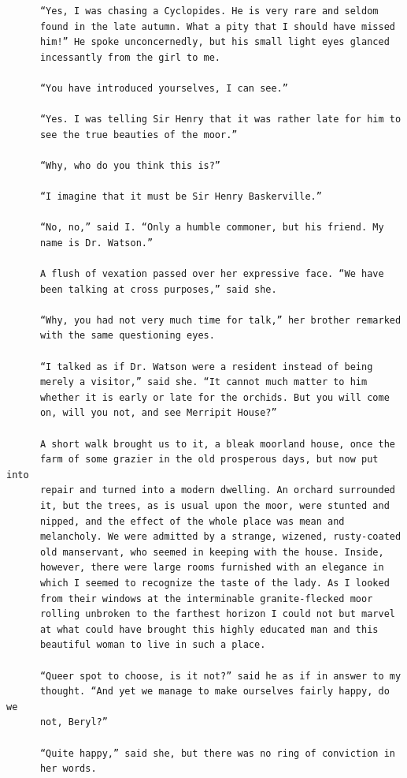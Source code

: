 \documentclass{article}
\begin{document}
\begin{verbatim}
      “Yes, I was chasing a Cyclopides. He is very rare and seldom
      found in the late autumn. What a pity that I should have missed
      him!” He spoke unconcernedly, but his small light eyes glanced
      incessantly from the girl to me.

      “You have introduced yourselves, I can see.”

      “Yes. I was telling Sir Henry that it was rather late for him to
      see the true beauties of the moor.”

      “Why, who do you think this is?”

      “I imagine that it must be Sir Henry Baskerville.”

      “No, no,” said I. “Only a humble commoner, but his friend. My
      name is Dr. Watson.”

      A flush of vexation passed over her expressive face. “We have
      been talking at cross purposes,” said she.

      “Why, you had not very much time for talk,” her brother remarked
      with the same questioning eyes.

      “I talked as if Dr. Watson were a resident instead of being
      merely a visitor,” said she. “It cannot much matter to him
      whether it is early or late for the orchids. But you will come
      on, will you not, and see Merripit House?”

      A short walk brought us to it, a bleak moorland house, once the
      farm of some grazier in the old prosperous days, but now put into
      repair and turned into a modern dwelling. An orchard surrounded
      it, but the trees, as is usual upon the moor, were stunted and
      nipped, and the effect of the whole place was mean and
      melancholy. We were admitted by a strange, wizened, rusty-coated
      old manservant, who seemed in keeping with the house. Inside,
      however, there were large rooms furnished with an elegance in
      which I seemed to recognize the taste of the lady. As I looked
      from their windows at the interminable granite-flecked moor
      rolling unbroken to the farthest horizon I could not but marvel
      at what could have brought this highly educated man and this
      beautiful woman to live in such a place.

      “Queer spot to choose, is it not?” said he as if in answer to my
      thought. “And yet we manage to make ourselves fairly happy, do we
      not, Beryl?”

      “Quite happy,” said she, but there was no ring of conviction in
      her words.


\end{verbatim}
\end{document}
